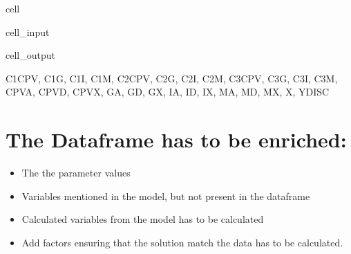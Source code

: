 \documentclass[letterpaper,10pt,english]{jupyterBook}
\begin{document}
\begin{sphinxuseclass}{cell}\begin{sphinxVerbatimInput}

\begin{sphinxuseclass}{cell_input}
\begin{sphinxVerbatim}[commandchars=\\\{\}]
\end{sphinxVerbatim}

\end{sphinxuseclass}\end{sphinxVerbatimInput}
\begin{sphinxVerbatimOutput}

\begin{sphinxuseclass}{cell_output}
\begin{sphinxVerbatim}[commandchars=\\\{\}]
\PYGZob{}\PYGZsq{}C1\PYGZus{}CPV\PYGZsq{},
 \PYGZsq{}C1\PYGZus{}G\PYGZsq{},
 \PYGZsq{}C1\PYGZus{}I\PYGZsq{},
 \PYGZsq{}C1\PYGZus{}M\PYGZsq{},
 \PYGZsq{}C2\PYGZus{}CPV\PYGZsq{},
 \PYGZsq{}C2\PYGZus{}G\PYGZsq{},
 \PYGZsq{}C2\PYGZus{}I\PYGZsq{},
 \PYGZsq{}C2\PYGZus{}M\PYGZsq{},
 \PYGZsq{}C3\PYGZus{}CPV\PYGZsq{},
 \PYGZsq{}C3\PYGZus{}G\PYGZsq{},
 \PYGZsq{}C3\PYGZus{}I\PYGZsq{},
 \PYGZsq{}C3\PYGZus{}M\PYGZsq{},
 \PYGZsq{}CPV\PYGZus{}A\PYGZsq{},
 \PYGZsq{}CPV\PYGZus{}D\PYGZsq{},
 \PYGZsq{}CPV\PYGZus{}X\PYGZsq{},
 \PYGZsq{}G\PYGZus{}A\PYGZsq{},
 \PYGZsq{}G\PYGZus{}D\PYGZsq{},
 \PYGZsq{}G\PYGZus{}X\PYGZsq{},
 \PYGZsq{}I\PYGZus{}A\PYGZsq{},
 \PYGZsq{}I\PYGZus{}D\PYGZsq{},
 \PYGZsq{}I\PYGZus{}X\PYGZsq{},
 \PYGZsq{}M\PYGZus{}A\PYGZsq{},
 \PYGZsq{}M\PYGZus{}D\PYGZsq{},
 \PYGZsq{}M\PYGZus{}X\PYGZsq{},
 \PYGZsq{}X\PYGZsq{},
 \PYGZsq{}YDISC\PYGZsq{}\PYGZcb{}
\end{sphinxVerbatim}

\end{sphinxuseclass}\end{sphinxVerbatimOutput}

\end{sphinxuseclass}

\section{The Dataframe has to be enriched:}
\label{\detokenize{content/howto/smallmodel/modelstart:the-dataframe-has-to-be-enriched}}\begin{itemize}
\item {} 
\sphinxAtStartPar
The the parameter values

\item {} 
\sphinxAtStartPar
Variables mentioned in the model, but not present in the dataframe

\item {} 
\sphinxAtStartPar
Calculated variables from the model has to be calculated

\item {} 
\sphinxAtStartPar
Add factors ensuring that the solution match the data has to be calculated.

\end{itemize}
\end{document}
